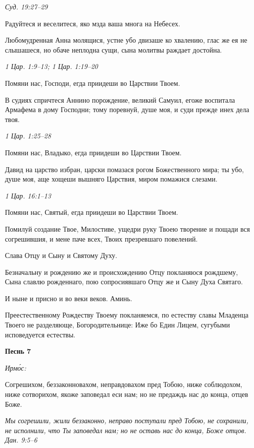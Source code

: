 \itshape Суд. 19:27–29\normalfont{}


Радуйтеся и веселитеся, яко мзда ваша многа на Небесех.


Любомудренная Анна молящися, устне убо двизаше ко хвалению, глас же ея не слышашеся, но обаче неплодна сущи, сына молитвы раждает достойна.


\itshape 1 Цар. 1:9–13; 1 Цар. 1:19–20\normalfont{}


Помяни нас, Господи, егда приидеши во Царствии Твоем.


В судиях спричтеся Аннино порождение, великий Самуил, егоже воспитала Армафема в дому Господни; тому поревнуй, душе моя, и суди прежде инех дела твоя.


\itshape 1 Цар. 1:25–28\normalfont{}


Помяни нас, Владыко, егда приидеши во Царствии Твоем.


Давид на царство избран, царски помазася рогом Божественного мира; ты убо, душе моя, аще хощеши вышняго Царствия, миром помажися слезами.


\itshape 1 Цар. 16:1–13\normalfont{}


Помяни нас, Святый, егда приидеши во Царствии Твоем.


Помилуй создание Твое, Милостиве, ущедри руку Твоею творение и пощади вся согрешившия, и мене паче всех, Твоих презревшаго повелений.


Слава Отцу и Сыну и Святому Духу.


Безначальну и рождению же и происхождению Отцу покланяюся рождшему, Сына славлю рожденнаго, пою сопросиявшаго Отцу же и Сыну Духа Святаго.


И ныне и присно и во веки веков. Аминь.


Преестественному Рождеству Твоему покланяемся, по естеству славы Младенца Твоего не разделяюще, Богородительнице: Иже бо Един Лицем, сугубыми исповедуется естествы.





\bfseries Песнь 7\normalfont{}


\itshape Ирмо́с:\normalfont{}


Согрешихом, беззаконновахом, неправдовахом пред Тобою, ниже соблюдохом, ниже сотворихом, якоже заповедал еси нам; но не предаждь нас до конца, отцев Боже.


\itshape Мы согрешили, жили беззаконно, неправо поступали пред Тобою, не сохранили, не исполнили, что Ты заповедал нам; но не оставь нас до конца, Боже отцов. Дан. 9:5–6\normalfont{}


